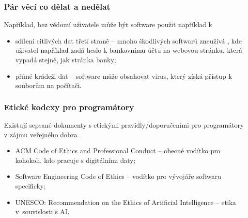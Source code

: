 \documentclass[aspectratio=169,11pt,svgnames,handout]{beamer}
\begin{document}
\begin{frame}
\frametitle{Pár věcí co dělat a nedělat}
Například, bez vědomí uživatele může být software použit například k
\begin{itemize}[label=\textbullet]
  \item \alert{sdílení citlivých dat třetí straně} -- mnoho škodlivých softwarů
    zneužívá , kde uživatel například zadá heslo k bankovnímu
    účtu na webovou stránku, která vypadá stejně, jak stránka banky;
  \item \alert{přímé krádeži dat} -- software může obsahovat virus, který získá
    přístup k souborům na počítači.
\end{itemize}
\end{frame}

\begin{frame}
\frametitle{Etické kodexy pro programátory}
Existují sepsané dokumenty s etickými pravidly/doporučeními pro programátory v
zájmu veřejného dobra.
\begin{itemize}[label=\textbullet]
  \item \alert{ACM Code of Ethics and Professional Conduct} -- obecné vodítko
    pro kohokoli, kdo pracuje s digitálními daty;
  \item \alert{Software Engineering Code of Ethics} -- vodítko pro vývojáře
    softwaru specificky;
  \item \alert{UNESCO: Recommendation on the Ethics of Artificial Intelligence}
    -- etika v~souvislosti s AI.
\end{itemize}
\end{frame}
\end{document}
